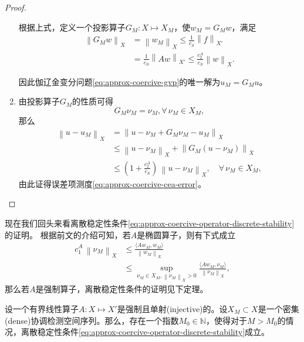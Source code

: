 \begin{proof}
\begin{enumerate}
根据上式，定义一个投影算子$G_{M} : X \mapsto X_{M}$，使$w_{M} = G_{M} w$，满足
\begin{equation*}
  \begin{split}
    \left\| G_{M} w \right\|_{X} & = \left\| w_{M} \right\|_{X} \le \frac{1}{c_{S}} \left\| f \right\|_{X'} \\
    & = \frac{1}{c_{S}} \left\| A w \right\|_{X'}
    \le \frac{c_{2}^{A}}{c_{S}} \left\| w \right\|_{X}.
  \end{split}
\end{equation*}

因此伽辽金变分问题\eqref{eq:approx-coercive-gvp}的唯一解为$u_{M} = G_{M} u$。

\item 由投影算子$G_{M}$的性质可得
\begin{equation*}
  G_{M} \nu_{M} = \nu_{M}, \forall \, \nu_{M} \in X_{M},
\end{equation*}
那么
\begin{equation*}
  \begin{split}
    \left\| u - u_{M} \right\|_{X} & =
    \left\| u - \nu_{M} + G_{M} \nu_{M} - u_{M} \right\|_{X} \\
    & \le \left\| u - \nu_{M} \right\|_{X} + \left\| G_{M} \left( u - \nu_{M} \right) \right\|_{X} \\
    & \le \left( 1 + \frac{c_{2}^{A}}{c_{S}} \right) \,
    \left\| u - \nu_{M} \right\|_{X}, \quad \forall \, \nu_{M} \in X_{M},
  \end{split}
\end{equation*}
由此证得误差项测度\eqref{eq:approx-coercive-cea-error}。
\end{enumerate}
\end{proof}

现在我们回头来看离散稳定性条件\eqref{eq:approx-coercive-operator-discrete-stability}的证明。
根据前文的介绍可知，若$A$是椭圆算子，则有下式成立
\begin{equation*}
\begin{split}
  c_{1}^{A} \, \left\| \nu_{M} \right\|_{X}
  & \le \frac{
  \langle A w_{M}, w_{M} \rangle
  }{
  \left\| w_{M} \right\|_{X}
  } \\
  & \le \sup_{\nu_{M} \in X_{M}, \left\| \nu_{M} \right\|_{X} > 0}
  \frac{
  \langle A w_{M}, \nu_{M} \rangle
  }{
  \left\| \nu_{M} \right\|_{X}
  },
\end{split}
\end{equation*}
那么若$A$是强制算子，离散稳定性条件的证明见下定理。
\begin{theorem}[强制算子的离散稳定性条件]
  \label{theorem:approx-coercive-operator-discrete-stability}
  设一个有界线性算子$A:X \mapsto X'$是强制且单射(injective)的。设$X_{M} \subset X$是一个密集(dense)协调检测空间序列。那么，存在一个指数$M_{0} \in \mathbb{N}$，使得对于$M > M_{0}$的情况，离散稳定性条件\eqref{eq:approx-coercive-operator-discrete-stability}成立。
\end{theorem}

